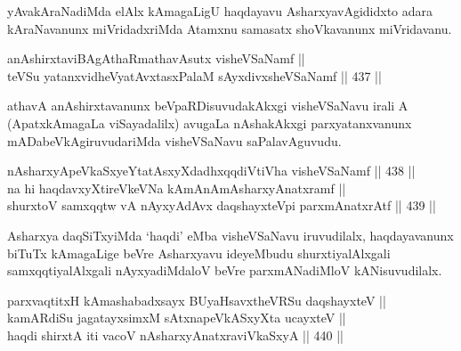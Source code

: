 \begin{artha}
yAvakAraNadiMda elAlx kAmagaLigU haqdayavu AsharxyavAgididxto adara
kAraNavanunx miVridadxriMda Atamxnu samasatx shoVkavanunx miVridavanu.
\end{artha}


\begin{shl}
anAshirxtaviBAgAthaRmathavA\s sutx visheVSaNamf || \\
teVSu yatanxvidheVyatAvxtasxPalaM sAyxdivxsheVSaNamf \hfill || 437 ||  
\end{shl}

\begin{artha}
athavA anAshirxtavanunx beVpaRDisuvudakAkxgi visheVSaNavu irali A
(ApatxkAmagaLa viSayadalilx) avugaLa nAshakAkxgi parxyatanxvanunx
mADabeVkAgiruvudariMda visheVSaNavu saPalavAguvudu.
\end{artha}


\begin{shl}
nA\s \s sharxyApeVkaSxyeYtatAsxyXdadhxqqdiVtiVha visheVSaNamf \hfill || 438 ||  \\
na hi haqdavxyXtireVkeVNa kAmAnAmAsharxyAnatxramf || \\
shurxtoV samxqqtw vA nAyxyAdAvx daqshayxteV\s pi parxmAnatxrAtf \hfill || 439 ||  
\end{shl}

\begin{artha}
Asharxya daqSiTxyiMda `haqdi' eMba visheVSaNavu iruvudilalx, haqdayavanunx
biTuTx kAmagaLige beVre Asharxyavu ideyeMbudu shurxtiyalAlxgali
samxqqtiyalAlxgali nAyxyadiMdaloV beVre parxmANadiMloV kANisuvudilalx.
\end{artha}


\begin{shl}
parxvaqtitxH kAmashabadxsayx BUyaHsavxtheVRSu daqshayxteV || \\
kamARdiSu jagatayxsimxM sAtxnapeVkASxyXta ucayxteV || \\
haqdi shirxtA iti vacoV nA\s \s sharxyAnatxraviVkaSxyA \hfill || 440 ||  
\end{shl}

